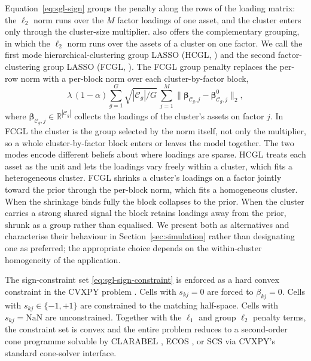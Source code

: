 \documentclass[article]{jss}
\begin{document}
Equation~\ref{eq:sgl-sign} groups the penalty along the rows of the
loading matrix: the \(\ell_2\) norm runs over the \(M\) factor loadings of
one asset, and the cluster enters only through the cluster-size
multiplier.  also offers the
complementary grouping, in which the \(\ell_2\) norm runs over the assets
of a cluster on one factor. We call the first mode
hierarchical-clustering group LASSO (HCGL,
) and the second
factor-clustering group LASSO (FCGL,
). The FCGL group penalty replaces the
per-row norm with a per-block norm over each cluster-by-factor block,
%
\begin{equation} \label{eq:fcgl}
\lambda\, (1 - \alpha) \sum_{g = 1}^{G} \sqrt{|\mathcal{C}_g| / G}\,
\sum_{j = 1}^{M}
\bigl\| \bm{\beta}_{\mathcal{C}_g, j} - \bm{\beta}^{0}_{\mathcal{C}_g, j} \bigr\|_2,
\end{equation}
%
where \(\bm{\beta}_{\mathcal{C}_g, j} \in \mathbb{R}^{|\mathcal{C}_g|}\)
collects the loadings of the cluster's assets on factor \(j\). In FCGL the
cluster is the group selected by the norm itself, not only the multiplier, so a whole
cluster-by-factor block enters or leaves the model together. The two
modes encode different beliefs about where loadings are sparse. HCGL
treats each asset as the unit and lets the loadings vary freely within a
cluster, which fits a heterogeneous cluster. FCGL shrinks a cluster's
loadings on a factor jointly toward the prior through the per-block norm,
which fits a homogeneous cluster. When the shrinkage binds fully the
block collapses to the prior. When the cluster carries a strong shared
signal the block retains loadings away from the prior, shrunk as a group
rather than equalised. We
present both as alternatives and characterise their behaviour in
Section~\ref{sec:simulation} rather than designating one as preferred;
the appropriate choice depends on the within-cluster homogeneity of the
application.

The sign-constraint set \ref{eq:sgl-sign-constraint} is enforced as a
hard convex constraint in the CVXPY problem
\citep{Diamond+Boyd:2016}. Cells with $s_{kj} = 0$ are forced to
$\beta_{kj} = 0$. Cells with $s_{kj} \in \{-1, +1\}$ are constrained to
the matching half-space. Cells with $s_{kj} = \mathrm{NaN}$ are
unconstrained. Together with the $\ell_1$ and group $\ell_2$ penalty terms, the
constraint set is convex and the entire problem reduces to a
second-order cone programme solvable by CLARABEL
\citep{Goulart+Chen:2024}, ECOS \citep{Domahidi+Chu+Boyd:2013}, or SCS
\citep{ODonoghue+Chu+Parikh+Boyd:2016} via
CVXPY's standard cone-solver interface.
\end{document}
